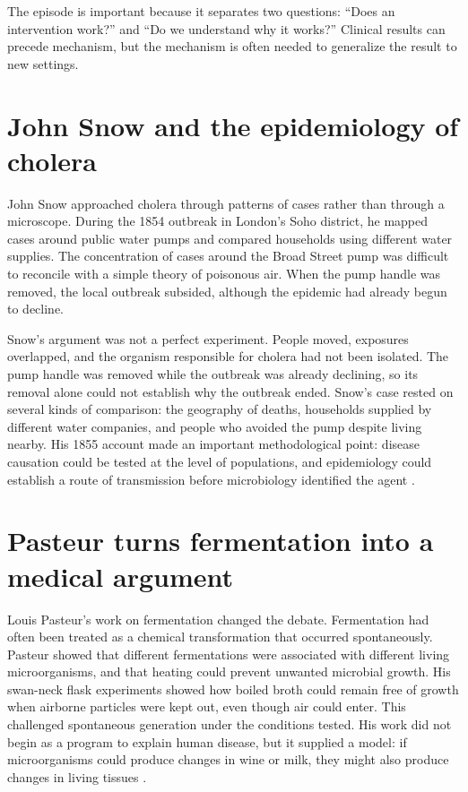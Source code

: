 \documentclass[12pt,oneside]{book}
\begin{document}
The episode is important because it separates two questions: ``Does an
intervention work?'' and ``Do we understand why it works?'' Clinical results can
precede mechanism, but the mechanism is often needed to generalize the result to
new settings.

\section{John Snow and the epidemiology of cholera}
John Snow approached cholera through patterns of cases rather than through a
microscope. During the 1854 outbreak in London's Soho district, he mapped cases
around public water pumps and compared households using different water
supplies. The concentration of cases around the Broad Street pump was difficult
to reconcile with a simple theory of poisonous air. When the pump handle was
removed, the local outbreak subsided, although the epidemic had already begun
to decline.

Snow's argument was not a perfect experiment. People moved, exposures overlapped,
and the organism responsible for cholera had not been isolated. The pump handle
was removed while the outbreak was already declining, so its removal alone
could not establish why the outbreak ended. Snow's case rested on several kinds
of comparison: the geography of deaths, households supplied by different water
companies, and people who avoided the pump despite living nearby. His 1855
account made an important methodological point: disease causation could be
tested at the level of populations, and epidemiology could establish a route of
transmission before microbiology identified the agent \cite{snowcholera}.

\section{Pasteur turns fermentation into a medical argument}
Louis Pasteur's work on fermentation changed the debate. Fermentation had often
been treated as a chemical transformation that occurred spontaneously. Pasteur
showed that different fermentations were associated with different living
microorganisms, and that heating could prevent unwanted microbial growth. His
swan-neck flask experiments showed how boiled broth could remain free of growth
when airborne particles were kept out, even though air could enter. This
challenged spontaneous generation under the conditions tested. His work did not
begin as a program to explain human disease, but it supplied a model: if
microorganisms could produce changes in wine or milk, they might also produce
changes in living tissues \cite{sciencehistorypasteur}.
\end{document}
